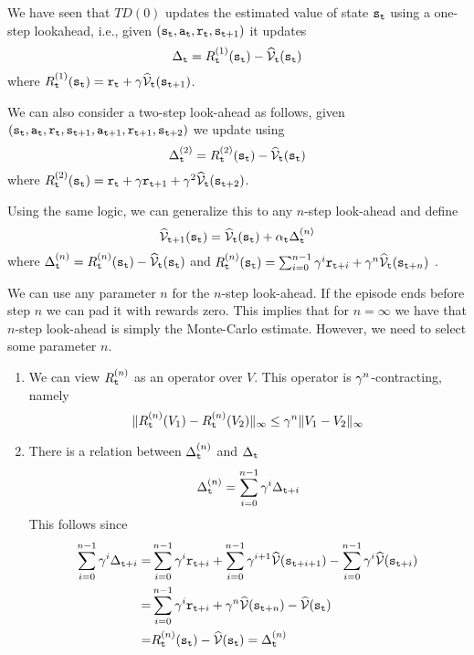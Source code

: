 We have seen that $TD(0)$ updates the estimated value of state ${\tt s}_{{\tt t}}$ 
using a one-step lookahead, i.e., given
$({\tt s}_{\tt t},{\tt a}_{\tt t},{\tt r}_{\tt t},{\tt s}_{{\tt t}+1})$ 
it updates 
\[\Delta_{\tt t}=R^{(1)}_{\tt t}({\tt s}_{\tt t}) -
\widehat{\mathcal{V}}_{{\tt t}}({\tt s}_{\tt t})\] 
where $R^{(1)}_{\tt t}({\tt s}_{\tt t})=
{\tt r}_{\tt t} +\gamma \widehat{\mathcal{V}}_{{\tt t}}({\tt s}_{{\tt t}+1})$.

\noindent We can also consider a two-step look-ahead as follows, given
$({\tt s}_{\tt t},{\tt a}_{\tt t},{\tt r}_{\tt t},{\tt s}_{{\tt t}+1},{\tt a}_{{\tt t}+1},{\tt r}_{{\tt t}+1},{\tt s}_{{\tt t}+2})$
we update using
\[\Delta^{(2)}_{\tt t}=R^{(2)}_{\tt t}({\tt s}_{\tt t}) -
\widehat{\mathcal{V}}_{{\tt t}}({\tt s}_{\tt t})\] 
where $R^{(2)}_{\tt t}({\tt s}_{\tt t})=
{\tt r}_{\tt t}+\gamma {\tt r}_{{\tt t}+1} +\gamma^2
\widehat{\mathcal{V}}_{{\tt t}}({\tt s}_{{\tt t}+2})$. 

\noindent Using the same logic, we can generalize this to any $n$-step look-ahead and define
\[\widehat{\mathcal{V}}_{{\tt t}+1}({\tt s}_{\tt t})=\widehat{\mathcal{V}}_{{\tt t}}({\tt s}_{\tt t})+\alpha_{\tt t}
\Delta^{(n)}_{\tt t}\] 
where $\Delta^{(n)}_{\tt t}=R^{(n)}_{\tt t}({\tt s}_{\tt t})-\widehat{\mathcal{V}}_{{\tt t}}({\tt s}_{\tt t})$
and $R^{(n)}_{\tt t}({\tt s}_{\tt t})= \sum_{i=0}^{n-1} \gamma^i
{\tt r}_{{\tt t}+i}+\gamma^n \widehat{\mathcal{V}}_{{\tt t}}({\tt s}_{{\tt t}+n})$ .

We can use any parameter $n$ for the $n$-step look-ahead. If the
episode ends before step $n$ we can pad it with rewards zero. This
implies that for $n=\infty$ we have that $n$-step look-ahead is
simply the Monte-Carlo estimate. However, we need to select some
parameter $n$. 

\begin{enumerate}
    \item We can view $R^{(n)}_{\tt t}$ as an operator over $V$. This operator is
$\gamma^n$-contracting, namely
\[
\| R^{(n)}_{\tt t}(V_1)-R^{(n)}_{\tt t}(V_2)\|_\infty \leq \gamma^n
\|V_1-V_2\|_\infty
\]
\item There is a relation between $\Delta^{(n)}_{\tt t}$ and $\Delta_{\tt t}$ 
\[
\Delta^{(n)}_{\tt t}=\sum_{i=0}^{n-1} \gamma^i \Delta_{{\tt t}+i}
\]
This follows since
\begin{align*}
\sum_{i=0}^{n-1} \gamma^i \Delta_{{\tt t}+i}
=&\sum_{i=0}^{n-1}
\gamma^i {\tt r}_{{\tt t}+i}+ \sum_{i=0}^{n-1} \gamma^{i+1}
\widehat{\mathcal{V}}({\tt s}_{{\tt t}+i+1})- \sum_{i=0}^{n-1} \gamma^{i}
\widehat{\mathcal{V}}({\tt s}_{{\tt t}+i})\\
=&\sum_{i=0}^{n-1} \gamma^i
{\tt r}_{{\tt t}+i}+\gamma^n
\widehat{\mathcal{V}}({\tt s}_{{\tt t}+n})-\widehat{\mathcal{V}}({\tt s}_{\tt t})\\
=&R^{(n)}_{\tt t}({\tt s}_{\tt t})-\widehat{\mathcal{V}}({\tt s}_{\tt t})=\Delta^{(n)}_{\tt t}
\end{align*}
\end{enumerate}

